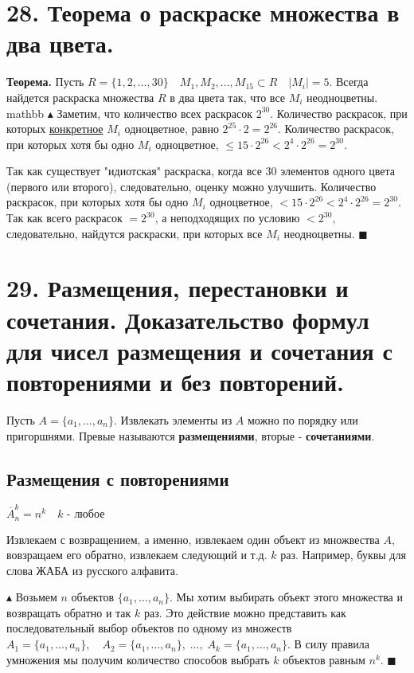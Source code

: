 \section*{28. Теорема о раскраске множества в два цвета.}

\textbf{Теорема.} Пусть $R=\{1,2,\ldots,30\} \quad M_1,M_2,\ldots,M_{15}\subset R \quad |M_i|=5$. Всегда найдется раскраска множества $R$ в два цвета так, что все $M_i$ неодноцветны.
mathbb $\blacktriangle$ Заметим, что количество всех раскрасок $2^{30}$. \newline Количество раскрасок, при которых \underline{конкретное} $M_i$ одноцветное, равно $2^{25}\cdot 2 = 2^{26}$. \newline Количество раскрасок, при которых хотя бы одно $M_i$ одноцветное, $\leq 15\cdot2^{26} < 2^4\cdot2^{26} = 2^{30}$.

Так как существует "идиотская" раскраска, когда все 30 элементов одного цвета (первого или второго), следовательно, оценку можно улучшить. Количество раскрасок, при которых хотя бы одно $M_i$ одноцветное, $< 15\cdot2^{26} < 2^4\cdot2^{26} = 2^{30}$. Так как всего раскрасок $=2^{30}$, а неподходящих по условию $<2^{30}$, следовательно, найдутся раскраски, при которых все $M_i$ неодноцветны. \quad $\blacksquare$

\section*{29. Размещения, перестановки и сочетания. Доказательство формул для чисел размещения и сочетания с повторениями и без повторений. }

Пусть $A = \{a_1, \ldots, a_n\}$. Извлекать элементы из $A$ можно по порядку или пригоршнями. Превые называются \textbf{размещениями}, вторые - \textbf{сочетаниями}.

\subsection*{Размещения с повторениями}
$\overline {A}_n^k = n^k \quad k\text{ - любое}$ 
\\ \par Извлекаем с возвращением, а именно, извлекаем один объект из множвества $A$, вовзращаем его обратно, извлекаем следующий и т.д. $k$ раз. Например, буквы для слова ЖАБА из русского алфавита.
\par $\blacktriangle$ Возьмем $n$ объектов $\{a_1,\ldots,a_n\}$. Мы хотим выбирать объект этого множества и возвращать обратно и так $k$ раз. Это действие можно представить как последовательный выбор объектов по одному из множеств $A_1 = \{a_1,\ldots,a_n\}, \quad A_2 = \{a_1,\ldots,a_n\}, \; \ldots, \; A_k = \{a_1,\ldots,a_n\}$. В силу правила умножения мы получим количество способов выбрать $k$ объектов равным $n^k$. \quad $\blacksquare$

